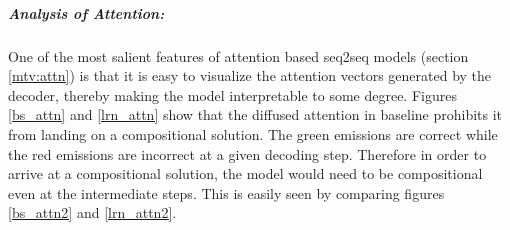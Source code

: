 \subparagraph{Analysis of Attention:} One of the most salient features of attention based seq2seq models (section \ref{mtv:attn}) is that it is easy to visualize the attention vectors generated by the decoder, thereby making the model interpretable to some degree. Figures \ref{bs_attn} and \ref{lrn_attn} show that the diffused attention in baseline prohibits it from landing on a compositional solution. The green emissions are correct while the red emissions are incorrect at a given decoding step. Therefore in order to arrive at a compositional solution, the model would need to be compositional even at the intermediate steps. This is easily seen by comparing figures \ref{bs_attn2} and \ref{lrn_attn2}.


